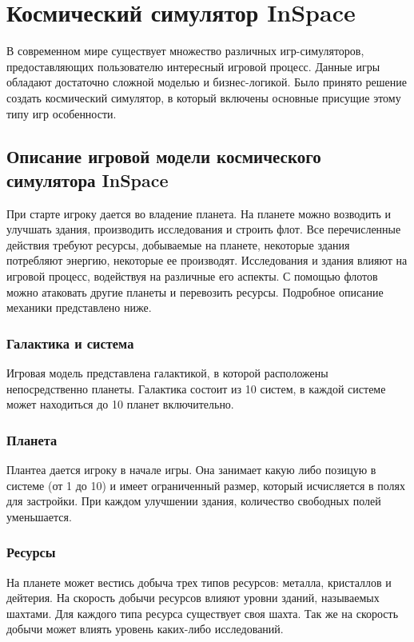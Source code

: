 





\tableofcontents
\newpage



\section{Космический симулятор InSpace}
\label{descr}
В современном мире существует множество различных игр-симуляторов, предоставляющих пользователю интересный игровой процесс. Данные игры обладают достаточно сложной моделью и бизнес-логикой. Было принято решение создать космический симулятор, в который включены основные присущие этому типу игр особенности.

\subsection{Описание игровой модели космического симулятора InSpace}

При старте игроку дается во владение планета. На планете можно возводить и улучшать здания, производить исследования и строить флот. Все перечисленные действия требуют ресурсы, добываемые на планете, некоторые здания потребляют энергию, некоторые ее производят. Исследования и здания влияют на игровой процесс, водействуя на различные его аспекты. С помощью флотов можно атаковать другие планеты и перевозить ресурсы. Подробное описание механики представлено ниже.

\subsubsection{Галактика и система}
Игровая модель представлена галактикой, в которой расположены непосредственно планеты. Галактика состоит из 10 систем, в каждой системе может находиться до 10 планет включительно.	

\subsubsection{Планета}
Плантеа дается игроку в начале игры. Она занимает какую либо позицую в системе (от 1 до 10) и имеет ограниченный размер, который исчисляется в полях для застройки. При каждом улучшении здания, количество свободных полей уменьшается. 

\subsubsection{Ресурсы}
На планете может вестись добыча трех типов ресурсов: металла, кристаллов и дейтерия. На скорость добычи ресурсов влияют уровни зданий, называемых шахтами. Для каждого типа ресурса существует своя шахта. Так же на скорость добычи может влиять уровень каких-либо исследований.

